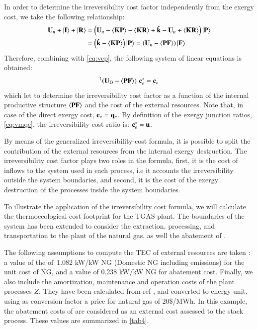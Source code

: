 \documentclass{ecos2018}
\begin{document}
In order to determine the irreversibility cost factor independently from the exergy cost, we take the following relationship:
\begin{equation}
\begin{split}
\mathbf{U}_n+\left| {\textbf{I} } \right\rangle+\left| {\textbf{R} } \right\rangle&=\left(\mathbf{U}_n-\langle \textbf{KP} \rangle-\langle \textbf{KR} \rangle+\hat{\mathbf{k}}-\mathbf{U}_n+\langle \textbf{KR} \rangle\right)\left| {\textbf{P} } \right\rangle\\
&=\left(\hat{\mathbf{k}}-\langle \textbf{KP} \rangle\right)\left| {\textbf{P} } \right\rangle=\left(\mathbf{U}_n-\langle \textbf{PF} \rangle\right)\left| {\textbf{F} } \right\rangle
\end{split}
\end{equation}
Therefore, combining with \cref{eq:vcp}, the following system of linear equations is obtained:
\begin{equation}
\prescript{\smash{\mathsf{t}}}{}{\mskip-1mu}\left(\mathbf{U}_\mathrm{D}-\langle \textbf{PF} \rangle\right)\,\mathbf{c}_{e}^{*}=\mathbf{c}_{e}
\end{equation}
which let to determine the irreversibility cost factor as a function of the internal productive structure $\langle \textbf{PF} \rangle$ and the cost of the external resources. Note that, in case of the direct exergy cost, $\mathbf{c}_e = \mathbf{q}_e$.  By definition of the exergy junction ratios, \cref{eq:vmqe}, the irreversibility cost ratio is: $\mathbf{c}_{e}^{*}=\mathbf{u}$.

By means of the generalized irreversibility-cost formula, it is possible to split the contribution of the external resources from the internal exergy destruction. The irreversibility cost factor plays two roles in the formula, first, it is the cost of inflows to the system used in each process, i.e it accounts the irreversibility outside the system boundaries, and second, it is the cost of the exergy destruction of the processes inside the system boundaries.

To illustrate the application of the irreversibility cost formula, we will calculate the thermoecological cost footprint for the TGAS plant. The boundaries of the system has been extended to consider the extraction, processing, and transportation to the plant of the natural gas, as well the abatement of . 

The following assumptions to compute the TEC of external resources are taken \cite{Uson2015}: a value of the of~1.082 kW/kW NG (Domestic NG including  emissions) for the unit cost of NG, and a value of 0.238 kW/kW NG for  abatement cost. Finally, we also include the amortization, maintenance and operation costs of the plant processes $Z$. They have been calculated from ref \cite{CGAM1994}, and converted to energy unit, using as conversion factor a price for natural gas of 20\$/MWh. In this example, the abatement costs of  are considered as an external cost assessed to the stack process. These values are summarized in \cref{tab4}.
\end{document}
